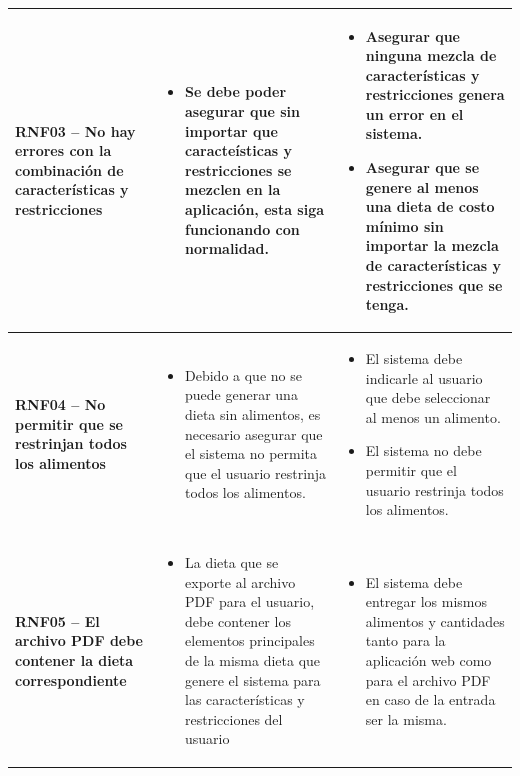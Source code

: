 \begin{longtable}[c]{| p{}  | p{}  | p{}  |}
         \textbf{RNF03 -- No hay errores con la combinaci\'on de caracter\'isticas y restricciones} & \begin{itemize}
             \item Se debe poder asegurar que sin importar que caracte\'isticas y restricciones se mezclen en la aplicaci\'on, esta siga funcionando con normalidad.
         \end{itemize}& \begin{itemize}
             \item Asegurar que ninguna mezcla de caracter\'isticas y restricciones genera un error en el sistema.
             \item Asegurar que se genere al menos una dieta de costo m\'inimo sin importar la mezcla de caracter\'isticas y restricciones que se tenga.
         \end{itemize} \\  \hline

         \textbf{RNF04 -- No permitir que se restrinjan todos los alimentos} & \begin{itemize}
             \item Debido a que no se puede generar una dieta sin alimentos, es necesario asegurar que el sistema no permita que el usuario restrinja todos los alimentos.
         \end{itemize}& \begin{itemize}
             \item El sistema debe indicarle al usuario que debe seleccionar al menos un alimento.
             \item El sistema no debe permitir que el usuario restrinja todos los alimentos.
         \end{itemize} \\  \hline

         \textbf{RNF05 -- El archivo PDF debe contener la dieta correspondiente} & \begin{itemize}
             \item La dieta que se exporte al archivo PDF para el usuario, debe contener los elementos principales de la misma dieta que genere el sistema para las caracter\'isticas y restricciones del usuario
         \end{itemize}& \begin{itemize}
             \item El sistema debe entregar los mismos alimentos y cantidades tanto para la aplicaci\'on web como para el archivo PDF en caso de la entrada ser la misma.
         \end{itemize} \\  \hline


\end{longtable}
